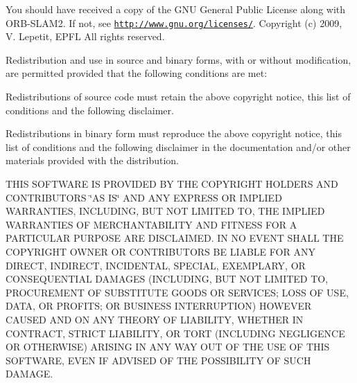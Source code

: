 You should have received a copy of the G\+NU General Public License along with O\+R\+B-\/\+S\+L\+A\+M2. If not, see \href{http://www.gnu.org/licenses/}{\tt http\+://www.\+gnu.\+org/licenses/}. Copyright (c) 2009, V. Lepetit, E\+P\+FL All rights reserved.

Redistribution and use in source and binary forms, with or without modification, are permitted provided that the following conditions are met\+:


\begin{DoxyEnumerate}
\item Redistributions of source code must retain the above copyright notice, this list of conditions and the following disclaimer.
\item Redistributions in binary form must reproduce the above copyright notice, this list of conditions and the following disclaimer in the documentation and/or other materials provided with the distribution.
\end{DoxyEnumerate}

T\+H\+IS S\+O\+F\+T\+W\+A\+RE IS P\+R\+O\+V\+I\+D\+ED BY T\+HE C\+O\+P\+Y\+R\+I\+G\+HT H\+O\+L\+D\+E\+RS A\+ND C\+O\+N\+T\+R\+I\+B\+U\+T\+O\+RS \char`\"{}\+A\+S I\+S\char`\"{} A\+ND A\+NY E\+X\+P\+R\+E\+SS OR I\+M\+P\+L\+I\+ED W\+A\+R\+R\+A\+N\+T\+I\+ES, I\+N\+C\+L\+U\+D\+I\+NG, B\+UT N\+OT L\+I\+M\+I\+T\+ED TO, T\+HE I\+M\+P\+L\+I\+ED W\+A\+R\+R\+A\+N\+T\+I\+ES OF M\+E\+R\+C\+H\+A\+N\+T\+A\+B\+I\+L\+I\+TY A\+ND F\+I\+T\+N\+E\+SS F\+OR A P\+A\+R\+T\+I\+C\+U\+L\+AR P\+U\+R\+P\+O\+SE A\+RE D\+I\+S\+C\+L\+A\+I\+M\+ED. IN NO E\+V\+E\+NT S\+H\+A\+LL T\+HE C\+O\+P\+Y\+R\+I\+G\+HT O\+W\+N\+ER OR C\+O\+N\+T\+R\+I\+B\+U\+T\+O\+RS BE L\+I\+A\+B\+LE F\+OR A\+NY D\+I\+R\+E\+CT, I\+N\+D\+I\+R\+E\+CT, I\+N\+C\+I\+D\+E\+N\+T\+AL, S\+P\+E\+C\+I\+AL, E\+X\+E\+M\+P\+L\+A\+RY, OR C\+O\+N\+S\+E\+Q\+U\+E\+N\+T\+I\+AL D\+A\+M\+A\+G\+ES (I\+N\+C\+L\+U\+D\+I\+NG, B\+UT N\+OT L\+I\+M\+I\+T\+ED TO, P\+R\+O\+C\+U\+R\+E\+M\+E\+NT OF S\+U\+B\+S\+T\+I\+T\+U\+TE G\+O\+O\+DS OR S\+E\+R\+V\+I\+C\+ES; L\+O\+SS OF U\+SE, D\+A\+TA, OR P\+R\+O\+F\+I\+TS; OR B\+U\+S\+I\+N\+E\+SS I\+N\+T\+E\+R\+R\+U\+P\+T\+I\+ON) H\+O\+W\+E\+V\+ER C\+A\+U\+S\+ED A\+ND ON A\+NY T\+H\+E\+O\+RY OF L\+I\+A\+B\+I\+L\+I\+TY, W\+H\+E\+T\+H\+ER IN C\+O\+N\+T\+R\+A\+CT, S\+T\+R\+I\+CT L\+I\+A\+B\+I\+L\+I\+TY, OR T\+O\+RT (I\+N\+C\+L\+U\+D\+I\+NG N\+E\+G\+L\+I\+G\+E\+N\+CE OR O\+T\+H\+E\+R\+W\+I\+SE) A\+R\+I\+S\+I\+NG IN A\+NY W\+AY O\+UT OF T\+HE U\+SE OF T\+H\+IS S\+O\+F\+T\+W\+A\+RE, E\+V\+EN IF A\+D\+V\+I\+S\+ED OF T\+HE P\+O\+S\+S\+I\+B\+I\+L\+I\+TY OF S\+U\+CH D\+A\+M\+A\+GE.

